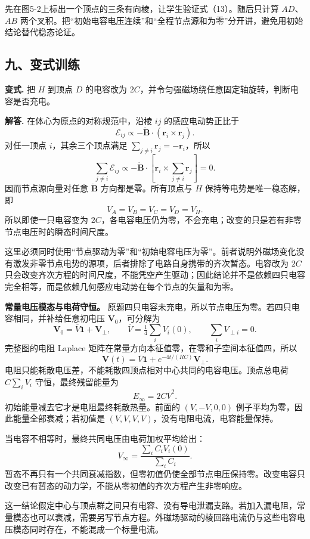 \documentclass[12pt,a4paper,UTF8]{ctexart}
\begin{document}
先在图5-2上标出一个顶点的三条有向棱，让学生验证式（13）。随后只计算
\(AD\)、\(AB\)
两个叉积。把``初始电容电压连续''和``全程节点源和为零''分开讲，避免用初始结论替代稳态论证。

\subsection{九、变式训练}\label{ux4e5dux53d8ux5f0fux8badux7ec3-4}

\textbf{变式.} 把 \(H\) 到顶点 \(D\) 的电容改为
\(2C\)，并令匀强磁场绕任意固定轴旋转，判断电容是否充电。

\textbf{解答.} 在体心为原点的对称规范中，沿棱 \(ij\) 的感应电动势正比于
\[
\mathcal E_{ij}\propto-\dot{\bm B}\cdot(\bm r_i\times\bm r_j).
\] 对任一顶点 \(i\)，其余三个顶点满足
\(\sum_{j\ne i}\bm r_j=-\bm r_i\)，所以 \[
\sum_{j\ne i}\mathcal E_{ij}
\propto-\dot{\bm B}\cdot
\left[\bm r_i\times\sum_{j\ne i}\bm r_j\right]=0.
\] 因而节点源向量对任意 \(\dot{\bm B}\) 方向都是零。所有顶点与 \(H\)
保持等电势是唯一稳态解，即 \[
\boxed{V_A=V_B=V_C=V_D=V_H}.
\] 所以即使一只电容变为
\(2C\)，各电容电压仍为零，不会充电；改变的只是若有非零节点电压时的瞬态时间尺度。

这里必须同时使用``节点驱动为零''和``初始电容电压为零''。前者说明外磁场变化没有激发非零节点电势的源项，后者排除了电路自身携带的齐次暂态。电容改为
\(2C\)
只会改变齐次方程的时间尺度，不能凭空产生驱动；因此结论并不是依赖四只电容完全相等，而是依赖几何感应电动势在每个节点的矢量和为零。

\textbf{常量电压模态与电荷守恒。}
原题四只电容未充电，所以节点电压为零。若四只电容相同，并补给任意初电压
\(\bm V_0\)，可分解为 \[
\bm V_0=\overline V\bm1+\bm V_\perp,
\qquad\overline V=\tfrac14\sum_iV_i(0),
\qquad\sum_iV_{\perp i}=0.
\] 完整图的电阻 Laplace
矩阵在常量方向本征值零，在零和子空间本征值四，所以 \[
\bm V(t)=\overline V\bm1+e^{-4t/(RC)}\bm V_\perp.
\] 电阻只能耗散电压差，不能耗散四顶点相对中心共同的电容电压。顶点总电荷
\(C\sum_iV_i\) 守恒，最终残留能量为 \[
E_\infty=2C\overline V^2.
\] 初始能量减去它才是电阻最终耗散热量。前面的 \((V,-V,0,0)\)
例子平均为零，因此能量全部衰减；若初值是
\((V,V,V,V)\)，没有电阻电流，电容能量保持。

当电容不相等时，最终共同电压由电荷加权平均给出： \[
V_\infty=\frac{\sum_iC_iV_i(0)}{\sum_iC_i}.
\]
暂态不再只有一个共同衰减指数，但零初值仍使全部节点电压保持零。改变电容只改变已有暂态的动力学，不能从零初值的齐次方程产生非零响应。

这一结论假定中心与顶点群之间只有电容、没有导电泄漏支路。若加入漏电阻，常量模态也可以衰减，需要另写节点方程。外磁场驱动的棱回路电流仍与这些电容电压模态同时存在，不能混成一个标量电流。
\end{document}

